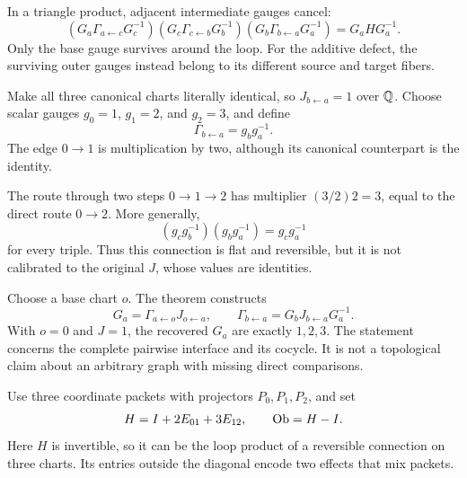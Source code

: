 In a triangle product, adjacent intermediate gauges cancel:
\[
(G_a\Gamma_{a\leftarrow c}G_c^{-1})
(G_c\Gamma_{c\leftarrow b}G_b^{-1})
(G_b\Gamma_{b\leftarrow a}G_a^{-1})
=G_aHG_a^{-1}.
\]
Only the base gauge survives around the loop. For the additive defect, the surviving outer gauges instead belong to its different source and target fibers.


Make all three canonical charts literally identical, so $J_{b\leftarrow a}=1$ over $\mathbb Q$. Choose scalar gauges $g_0=1$, $g_1=2$, and $g_2=3$, and define
\[
\Gamma_{b\leftarrow a}=g_b g_a^{-1}.
\]
The edge $0\to1$ is multiplication by two, although its canonical counterpart is the identity.


The route through two steps $0\to1\to2$ has multiplier $(3/2)2=3$, equal to the direct route $0\to2$. More generally,
\[
(g_cg_b^{-1})(g_bg_a^{-1})=g_cg_a^{-1}
\]
for every triple. Thus this connection is flat and reversible, but it is not calibrated to the original $J$, whose values are identities.

Choose a base chart $o$. The theorem constructs
\[
G_a=\Gamma_{a\leftarrow o}J_{o\leftarrow a},
\qquad
\Gamma_{b\leftarrow a}=G_bJ_{b\leftarrow a}G_a^{-1}.
\]
With $o=0$ and $J=1$, the recovered $G_a$ are exactly $1,2,3$. The statement concerns the complete pairwise interface and its cocycle. It is not a topological claim about an arbitrary graph with missing direct comparisons.


Use three coordinate packets with projectors $P_0,P_1,P_2$, and set
\[
H=I+2E_{01}+3E_{12},\qquad \operatorname{Ob}=H-I.
\]
Here $H$ is invertible, so it can be the loop product of a reversible connection on three charts. Its entries outside the diagonal encode two effects that mix packets.

